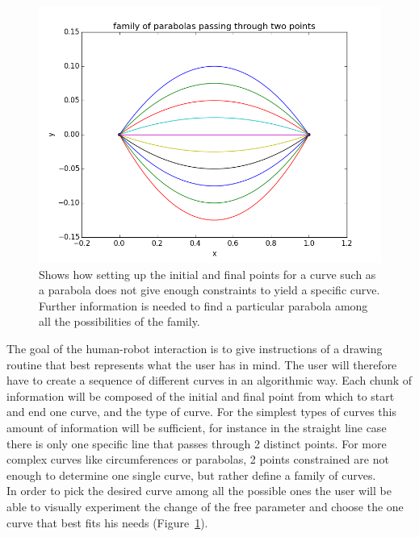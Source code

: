     \begin{figure}
        \centering
        \includegraphics[width=\textwidth]{Files/family_of_curves}
        \caption{Shows how setting up the initial and final points for a curve such as a parabola does not give enough constraints to yield a specific curve. Further information is needed to find a particular parabola among all the possibilities of the family.}
        \label{fig:family of curves}
    \end{figure}

    The goal of the human-robot interaction is to give instructions of a drawing routine that best represents what the user has in mind. The user will therefore have to create a sequence of different curves in an algorithmic way. Each chunk of information will be composed of the initial and final point from which to start and end one curve, and the type of curve. For the simplest types of curves this amount of information will be sufficient, for instance in the straight line case there is only one specific line that passes through 2 distinct points. For more complex curves like circumferences or parabolas, 2 points constrained are not enough to determine one single curve, but rather define a family of curves.\\
    In order to pick the desired curve among all the possible ones the user will be able to visually experiment the change of the free parameter and choose the one curve that best fits his needs (Figure~\ref{fig:family of curves}).

